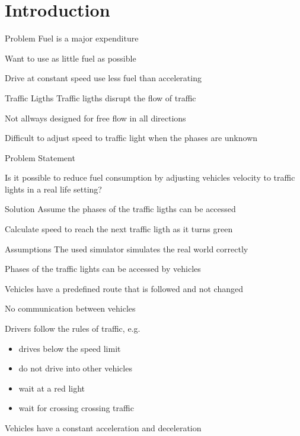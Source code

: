 

\section{Introduction}
\begin{frame}{Problem}
Fuel is a major expenditure

Want to use as little fuel as possible

Drive at constant speed use less fuel than accelerating
\end{frame}

\begin{frame}{Traffic Ligths}
Traffic ligths disrupt the flow of traffic

Not allways designed for free flow in all directions

Difficult to adjust speed to traffic light when the phases are unknown
\end{frame}

\begin{frame}{Problem Statement}
\begin{center}
Is it possible to reduce fuel consumption by adjusting vehicles velocity to traffic lights in a real life setting?
\end{center}
\end{frame}

\begin{frame}{Solution}
Assume the phases of the traffic ligths can be accessed

Calculate speed to reach the next traffic ligth as it turns green
\end{frame}

\begin{frame}{Assumptions}
The used simulator simulates the real world correctly

Phases of the traffic lights can be accessed by vehicles

Vehicles have a predefined route that is followed and not changed

No communication between vehicles

Drivers follow the rules of traffic, e.g. 
\begin{itemize}
\item drives below the speed limit
\item do not drive into other vehicles
\item wait at a red light
\item wait for crossing crossing traffic
\end{itemize}

Vehicles have a constant acceleration and deceleration

\end{frame}
